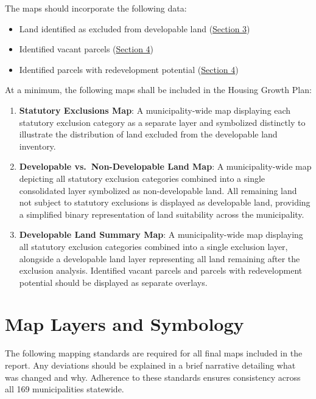 \documentclass[
  letterpaper,
  DIV=11,
  numbers=noendperiod]{scrreprt}
\providecommand{\tightlist}{%
  \setlength{\itemsep}{0pt}\setlength{\parskip}{0pt}}
\begin{document}
The maps should incorporate the following data:

\begin{itemize}
\tightlist
\item
  Land identified as excluded from developable land
  (\hyperref[sec-statutory-exclusions]{Section 3})
\item
  Identified vacant parcels
  (\hyperref[identifying-vacant-and-potential-land-for-redevelopment]{Section
  4})
\item
  Identified parcels with redevelopment potential
  (\hyperref[identifying-vacant-and-potential-land-for-redevelopment]{Section
  4})
\end{itemize}

At a minimum, the following maps shall be included in the Housing Growth
Plan:

\begin{enumerate}
\def\labelenumi{\arabic{enumi}.}
\item
  \textbf{Statutory Exclusions Map}: A municipality-wide map displaying
  each statutory exclusion category as a separate layer and symbolized
  distinctly to illustrate the distribution of land excluded from the
  developable land inventory.
\item
  \textbf{Developable vs.~Non-Developable Land Map}: A municipality-wide
  map depicting all statutory exclusion categories combined into a
  single consolidated layer symbolized as non-developable land. All
  remaining land not subject to statutory exclusions is displayed as
  developable land, providing a simplified binary representation of land
  suitability across the municipality.
\item
  \textbf{Developable Land Summary Map}: A municipality-wide map
  displaying all statutory exclusion categories combined into a single
  exclusion layer, alongside a developable land layer representing all
  land remaining after the exclusion analysis. Identified vacant parcels
  and parcels with redevelopment potential should be displayed as
  separate overlays.
\end{enumerate}

\section{Map Layers and Symbology}\label{map-layers-and-symbology}

The following mapping standards are required for all final maps included
in the report. Any deviations should be explained in a brief narrative
detailing what was changed and why. Adherence to these standards ensures
consistency across all 169 municipalities statewide.
\end{document}
